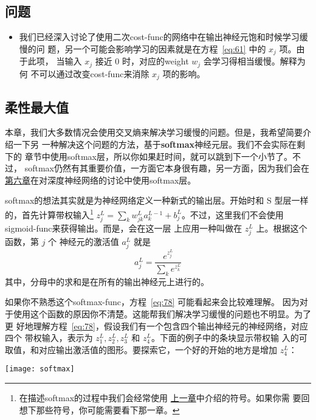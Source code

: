\subsection*{问题}

\begin{itemize}
\item 我们已经深入讨论了使用二次\gls*{cost-func}的网络中在输出神经元饱和时候学习缓慢的问
  题，另一个可能会影响学习的因素就是在方程~\eqref{eq:61} 中的 $x_j$ 项。由于此项，
  当输入 $x_j$ 接近 $0$ 时，对应的\gls*{weight} $w_j$ 会学习得相当缓慢。解释为何
  不可以通过改变\gls*{cost-func}来消除 $x_j$ 项的影响。
\end{itemize}

\subsection{柔性最大值}
\label{subsec:softmax}

本章，我们大多数情况会使用交叉熵来解决学习缓慢的问题。但是，我希望简要介绍一下另
一种解决这个问题的方法，基于\textbf{\gls{softmax}}神经元层。我们不会实际在剩下的
章节中使用\gls*{softmax}层，所以你如果赶时间，就可以跳到下一个小节了。不过，%
\gls*{softmax}仍然有其重要价值，一方面它本身很有趣，另一方面，因为我们会在%
\hyperref[ch:Deeplearning]{第六章}在对深度神经网络的讨论中使用\gls*{softmax}层。

\gls*{softmax}的想法其实就是为神经网络定义一种新式的输出层。开始时和 S 型层一样
的，首先计算带权输入\footnote{在描述\gls*{softmax}的过程中我们会经常使用%
\hyperref[ch:HowTheBackpropagationAlgorithmWorks]{上一章}中介绍的符号。如果你需
要回想下那些符号，你可能需要看下那一章。} $z^L_j = \sum_{k} w^L_{jk} a^{L-1}_k +
  b^L_j$。不过，这里我们不会使用\gls*{sigmoid-func}来获得输出。而是，会在这一层
  上应用一种叫做在 $z^L_j$ 上。根据这个函数，第 $j$ 个
  神经元的激活值 $a^L_j$ 就是
\begin{equation}
  a^L_j = \frac{e^{z^L_j}}{\sum_k e^{z^L_k}}
  \label{eq:78}\tag{78}
\end{equation}
其中，分母中的求和是在所有的输出神经元上进行的。

如果你不熟悉这个\gls*{softmax-func}，方程~\eqref{eq:78} 可能看起来会比较难理解。
因为对于使用这个函数的原因你不清楚。这能帮我们解决学习缓慢的问题也不明显。为了更
好地理解方程~\eqref{eq:78}，假设我们有一个包含四个输出神经元的神经网络，对应四个
带权输入，表示为 $z^L_1, z^L_2, z^L_3$ 和 $z^L_4$。下面的例子中的条块显示带权输
入的可取值，和对应输出激活值的图形。要探索它，一个好的开始的地方是增加 $z^L_4$：
\begin{center}
  \texttt{[image: softmax]}
\end{center}

